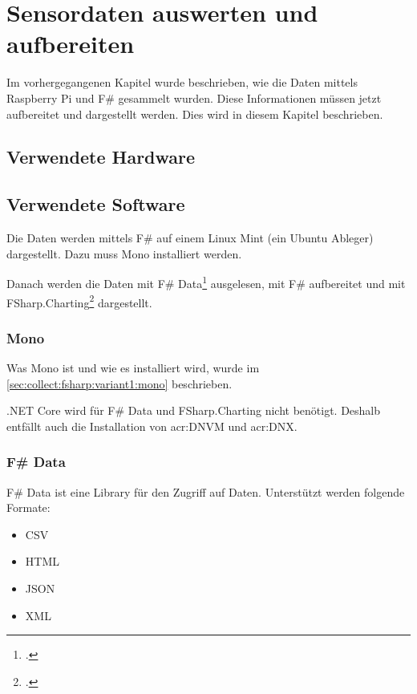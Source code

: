 
\chapter{Sensordaten auswerten und aufbereiten}
Im vorhergegangenen Kapitel wurde beschrieben, wie die Daten mittels Raspberry Pi und F\# gesammelt wurden. Diese Informationen müssen jetzt aufbereitet und dargestellt werden. Dies wird in diesem Kapitel beschrieben.

\section{Verwendete Hardware}

\section{Verwendete Software}
\label{sec:display:software}
Die Daten werden mittels F\# auf einem Linux Mint (ein Ubuntu Ableger) dargestellt. Dazu muss Mono installiert werden. 

Danach werden die Daten mit F\# Data\footcite{FShaprp_Data_2016-06-17} ausgelesen, mit F\# aufbereitet und mit FSharp.Charting\footcite{FSharp_Charting_2016-06-17} dargestellt.

\subsection{Mono}
Was Mono ist und wie es installiert wird, wurde im \cref{sec:collect:fsharp:variant1:mono}  beschrieben.

.NET Core wird für F\# Data und FSharp.Charting nicht benötigt. Deshalb entfällt auch die Installation von \gls{acr:DNVM} und \gls{acr:DNX}. 

\subsection{F\# Data}
\label{sec:display:software:fsharpdata}
F\# Data ist eine Library für den Zugriff auf Daten. Unterstützt werden folgende Formate:
\begin{itemize}
\item CSV
\item HTML
\item JSON
\item XML
\end{itemize}

